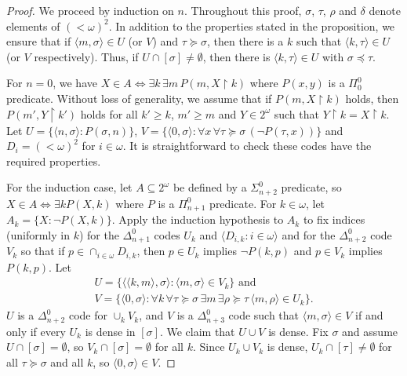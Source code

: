 \documentclass{amsart}
\theoremstyle{definition}
\theoremstyle{remark}
\begin{document}
\begin{proof}
We proceed by induction on $n$. Throughout this proof, $\sigma$, $\tau$, $\rho$ and $\delta$ denote elements of $(<\omega)^2$. In addition to the 
properties stated in the proposition, we ensure that if $\langle m,\sigma \rangle \in U$ (or $V$) and $\tau \succeq \sigma$, then there is a $k$ such 
that $\langle k,\tau \rangle \in U$ (or $V$ respectively). Thus, if $U \cap [\sigma] \neq \emptyset$, then there is $\langle k, \tau \rangle \in U$ with $\sigma \preceq \tau$.

For $n=0$, we have $X \in A \Leftrightarrow \exists k \, \exists m \, P(m, X \upharpoonright k)$ where $P(x,y)$ is a $\Pi^0_0$ 
predicate. Without loss of generality, we assume that if $P(m, X \upharpoonright k)$ holds, then $P(m', Y \upharpoonright k')$ holds for all $k' \geq k$, $m' \geq m$ 
and $Y \in 2^{\omega}$ such that $Y \upharpoonright k = X \upharpoonright k$. Let 
$U = \{ \langle n,\sigma \rangle : P(\sigma,n) \}$, $V = \{ \langle 0,\sigma \rangle : \forall x \, \forall \tau \succeq \sigma \, (\neg P(\tau,x)) \}$ and 
$D_i = (<\omega)^2$ for $i \in \omega$. It is straightforward to check these codes have the required properties. 

For the induction case, let $A \subseteq 2^{\omega}$ be defined by a $\Sigma^0_{n+2}$ predicate, so $X \in A \Leftrightarrow \exists k P(X,k)$ where $P$ is a 
$\Pi^0_{n+1}$ predicate. For $k \in \omega$, let $A_k = \{ X : \neg P(X,k) \}$. Apply the induction hypothesis to $A_k$ to  
fix indices (uniformly in $k$) for the $\Delta^0_{n+1}$ codes $U_k$ and $\langle  D_{i,k} : i \in \omega \rangle$ and for the $\Delta^0_{n+2}$ code $V_k$ 
so that if $p \in \cap_{i \in \omega} D_{i,k}$, then $p \in U_k$ implies $\neg P(k,p)$ and $p \in V_k$ implies $P(k,p)$. Let 
\begin{gather*}
U = \{ \langle \langle k,m \rangle, \sigma \rangle : \langle m,\sigma \rangle \in V_k \} \text{ and} \\
V = \{ \langle 0,\sigma \rangle : \forall k \, \forall \tau \succeq \sigma \, \exists m \, \exists \rho \succeq \tau \, \langle m,\rho \rangle \in U_k \}.
\end{gather*}
$U$ is a $\Delta^0_{n+2}$ code for $\cup_k V_k$, and $V$ is a $\Delta^0_{n+3}$ code such that $\langle m, \sigma \rangle \in V$ if and only if every 
$U_k$ is dense in $[\sigma]$. 
We claim that $U \cup V$ is dense. Fix $\sigma$ and assume $U \cap [\sigma] = \emptyset$, so $V_k \cap [\sigma] = \emptyset$ for all $k$. 
Since $U_k \cup V_k$ is dense, $U_k \cap [\tau] \neq \emptyset$ for all $\tau \succeq \sigma$ and all $k$, so $\langle 0, \sigma \rangle \in V$. 


\end{proof}
\end{document}
